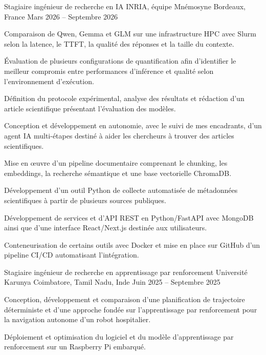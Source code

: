 
\begin{cventries}
  \cventry
    {Stagiaire ingénieur de recherche en IA}
    {INRIA, équipe Mnémosyne}
    {Bordeaux, France}
    {Mars 2026 -- Septembre 2026}
    {
      \begin{cvitems}
        \item {Comparaison de Qwen, Gemma et GLM sur une infrastructure HPC avec Slurm selon la latence, le TTFT, la qualité des réponses et la taille du contexte.}
        \item {Évaluation de plusieurs configurations de quantification afin d’identifier le meilleur compromis entre performances d’inférence et qualité selon l’environnement d’exécution.}
        \item {Définition du protocole expérimental, analyse des résultats et rédaction d’un article scientifique présentant l’évaluation des modèles.}
        \item {Conception et développement en autonomie, avec le suivi de mes encadrants, d’un agent IA multi-étapes destiné à aider les chercheurs à trouver des articles scientifiques.}
        \item {Mise en œuvre d’un pipeline documentaire comprenant le chunking, les embeddings, la recherche sémantique et une base vectorielle ChromaDB.}
        \item {Développement d’un outil Python de collecte automatisée de métadonnées scientifiques à partir de plusieurs sources publiques.}
        \item {Développement de services et d’API REST en Python/FastAPI avec MongoDB ainsi que d’une interface React/Next.js destinée aux utilisateurs.}
        \item {Conteneurisation de certains outils avec Docker et mise en place sur GitHub d’un pipeline CI/CD automatisant l’intégration.}
      \end{cvitems}
    }

  \cventry
    {Stagiaire ingénieur de recherche en apprentissage par renforcement}
    {Université Karunya}
    {Coimbatore, Tamil Nadu, Inde}
    {Juin 2025 -- Septembre 2025}
    {
      \begin{cvitems}
        \item {Conception, développement et comparaison d’une planification de trajectoire déterministe et d’une approche fondée sur l’apprentissage par renforcement pour la navigation autonome d’un robot hospitalier.}
        \item {Déploiement et optimisation du logiciel et du modèle d’apprentissage par renforcement sur un Raspberry Pi embarqué.}
      \end{cvitems}
    }
\end{cventries}
